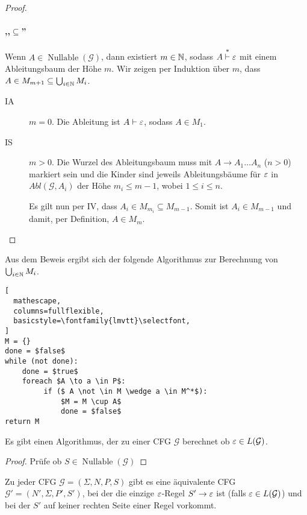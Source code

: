 \begin{proof}
  
  \paragraph{,,$\subseteq$''}
  Wenn $A \in \operatorname{Nullable}(\mathcal{G})$, dann existiert $m
  \in \mathbb{N}$, sodass $A \stackrel{*}{\vdash} \varepsilon$ mit einem
  Ableitungsbaum der Höhe $m$.
  Wir zeigen per Induktion über $m$, dass $A \in M_{m+1} \subseteq \bigcup_{i \in \mathbb{N}} M_i$.
  \begin{description}
  \item[IA] $m = 0$. Die Ableitung ist $A \vdash \varepsilon$, sodass $A\in M_1$.
  \item[IS] $m > 0$.
    Die Wurzel des Ableitungsbaum muss mit $A \to A_1\ldots A_n$ ($n>0$)
    markiert sein und die Kinder sind jeweils Ableitungsbäume für
    $\varepsilon$ in  $Abl(\mathcal{G}, A_i)$ der Höhe $m_i \le m-1$, wobei $1 \le i \le n$.
    
    Es gilt nun per IV, dass $A_i \in M_{m_i} \subseteq M_{m-1}$.
    Somit ist $A_i \in M_{m-1}$ und damit, per Definition, $A \in M_m$.
  \end{description}
\end{proof}
Aus dem Beweis ergibt sich der folgende Algorithmus zur Berechnung von $\bigcup_{i \in \mathbb{N}} M_i$.
\begin{lstlisting}[
  mathescape,
  columns=fullflexible,
  basicstyle=\fontfamily{lmvtt}\selectfont,
]
M = {}
done = $false$
while (not done):
    done = $true$
    foreach $A \to a \in P$:
         if ($ A \not \in M \wedge a \in M^*$):
             $M = M \cup A$
             done = $false$
return M
\end{lstlisting}
\begin{Korollar}
  Es gibt einen Algorithmus, der zu einer CFG $\mathcal{G}$ berechnet ob $\varepsilon \in L(\mathcal{G})$.
\end{Korollar}
\begin{proof}
  Prüfe ob $S \in \operatorname{Nullable}(\mathcal{G})$
\end{proof}
\begin{lemma}
  Zu jeder CFG $\mathcal{G}=(\Sigma, N, P, S)$ gibt es eine äquivalente CFG $\mathcal{G'} =(N', \Sigma, P', S')$, bei der die einzige $\varepsilon$-Regel $S' \to \varepsilon$ ist (falls $\varepsilon \in L(\mathcal{G})$) und bei der $S'$ auf keiner rechten Seite einer Regel vorkommt.
\end{lemma}

